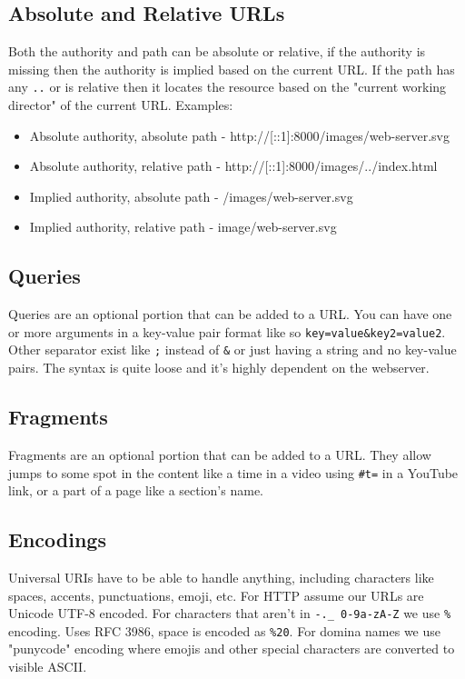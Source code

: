 \documentclass[../CMPUT-404-Notes.tex]{subfiles}
\begin{document}
\subsection{Absolute and Relative URLs}
Both the authority and path can be absolute or relative, if the authority is missing then the authority is implied based on the current URL.
If the path has any \texttt{..} or is relative then it locates the resource based on the "current working director" of the current URL.
Examples:
\begin{itemize}
  \item Absolute authority, absolute path - http://[::1]:8000/images/web-server.svg
  \item Absolute authority, relative path - http://[::1]:8000/images/../index.html
  \item Implied authority, absolute path - /images/web-server.svg
  \item Implied authority, relative path - image/web-server.svg
\end{itemize}

\subsection{Queries}
Queries are an optional portion that can be added to a URL.
You can have one or more arguments in a key-value pair format like so \texttt{key=value\&key2=value2}.
Other separator exist like \texttt{;} instead of \texttt{\&} or just having a string and no key-value pairs.
The syntax is quite loose and it's highly dependent on the webserver. 

\subsection{Fragments}
Fragments are an optional portion that can be added to a URL.
They allow jumps to some spot in the content like a time in a video using \texttt{\#t=} in a YouTube link, or a part of a page like a section's name.

\subsection{Encodings}
Universal URIs have to be able to handle anything, including characters like spaces, accents, punctuations, emoji, etc.
For HTTP assume our URLs are Unicode UTF-8 encoded. For characters that aren't in \texttt{-.\_~0-9a-zA-Z} we use \texttt{\%} encoding.
Uses RFC 3986, space is encoded as \texttt{\%20}. For domina names we use "punycode" encoding where emojis and other special characters are converted to visible ASCII.
\end{document}
